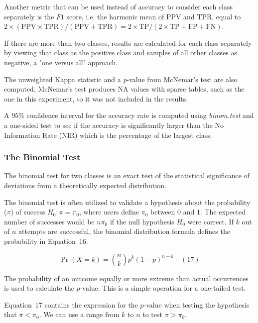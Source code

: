 \documentclass[sn-mathphys-num]{sn-jnl}%
\begin{document}
Another metric that can be used instead of accuracy to consider each class separately is the $F1$ score, i.e. the harmonic mean of PPV and TPR, equal to $2 \times (\mathrm{PPV} \times \mathrm{TPR}) / (\mathrm{PPV} + \mathrm{TPR}) = 2 \times \mathrm{TP} / (2 \times \mathrm{TP} + \mathrm{FP} + \mathrm{FN})$.

If there are more than two classes, results are calculated for each class separately by viewing that class as the positive class and samples of all other classes as negative, a "one versus all" approach.

The unweighted Kappa statistic and a \textit{p}-value from McNemar's test are also computed. McNemar's test produces NA values with sparse tables, such as the one in this experiment, so it was not included in the results.

A $95\%$ confidence interval for the accuracy rate is computed using \textit{binom.test} and a one-sided test \cite{binom.test2024, clopper1934use, conover1999practical, hollander2013nonparametric} to see if the accuracy is significantly larger than the No Information Rate (NIR) which is the percentage of the largest class.

\subsubsection{The Binomial Test}

The binomial test \cite{howell1992statistical, graphpadGraphPadPrism} for two classes is an exact test of the statistical significance of deviations from a theoretically expected distribution.

The binomial test is often utilized to validate a hypothesis about the probability ($\pi$) of success $H_{0}\colon \pi =\pi_{0}$, where users define $\pi_{0}$ between $0$ and $1$. The expected number of successes would be $n\pi_{0}$ if the null hypothesis $H_{0}$ were correct. If $k$ out of $n$ attempts are successful, the binomial distribution formula defines the probability in Equation~16.

\begin{equation}
	\Pr(X=k)={\binom{n}{k}}p^{k}(1-p)^{n-k}
	\quad\left(17\right)
\end{equation}

The probability of an outcome equally or more extreme than actual occurrences is used to calculate the $p$-value. This is a simple operation for a one-tailed test. 

Equation~17 contains the expression for the $p$-value when testing the hypothesis that $\pi <\pi_{0}$. We can use a range from $k$ to $n$ to test $\pi >\pi_{0}$.
\end{document}
